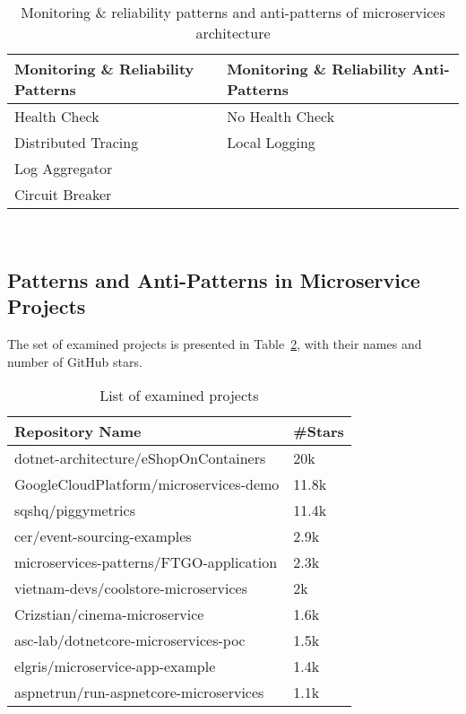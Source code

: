 \documentclass[11pt,a4paper,twocolumn]{article}
\begin{document}
\begin{table}[H]
\centering 
    \begin{tabular}{ 
  | >{\centering\arraybackslash} m{9em} 
  | >{\centering\arraybackslash} m{9em} | }
    \hline
    \rowcolor{bluepoli!40}
    \textbf{Monitoring \& Reliability Patterns} & \textbf{Monitoring \& Reliability Anti-Patterns}\T\B \\
    \hline \hline
    Health Check & No Health Check\T\B\\
    \hline
    \rowcolor{bluepoli!10}
    Distributed Tracing & Local Logging\T\B\\
    \hline
    Log Aggregator & \T\B\\
    \hline
    \rowcolor{bluepoli!10}
    Circuit Breaker & \T\B\\
    \hline
    \end{tabular}
    \\[10pt]
    \caption{Monitoring \& reliability patterns and anti-patterns of microservices architecture}
    \label{table:pattern_table_3}
\end{table}

\subsection{Patterns and Anti-Patterns in Microservice Projects}
\label{subsec:rq2}

The set of examined projects is presented in Table~\ref{table:project_list}, with their names and number of GitHub stars.
\begin{table}[H]
\centering 
    \begin{tabular}{ 
  | >{\centering\arraybackslash} m{15.3em} 
  | >{\centering\arraybackslash} m{3.5em} | }
    \hline
    \rowcolor{bluepoli!40}
    \textbf{Repository Name} & \textbf{\#Stars}\T\B \\
    \hline \hline
    dotnet-architecture/eShopOnContainers & 20k\T\B\\
    \hline
    \rowcolor{bluepoli!10}
    GoogleCloudPlatform/microservices-demo & 11.8k\T\B\\
    \hline
    sqshq/piggymetrics & 11.4k\T\B\\
    \hline
    \rowcolor{bluepoli!10}
    cer/event-sourcing-examples & 2.9k\T\B\\
    \hline
    microservices-patterns/FTGO-application & 2.3k\T\B\\
    \hline
    \rowcolor{bluepoli!10}
    vietnam-devs/coolstore-microservices & 2k\T\B\\
    \hline
    Crizstian/cinema-microservice & 1.6k\T\B\\
    \hline
    \rowcolor{bluepoli!10}
    asc-lab/dotnetcore-microservices-poc & 1.5k\T\B\\
    \hline
    elgris/microservice-app-example & 1.4k\T\B\\
    \hline
    \rowcolor{bluepoli!10}
    aspnetrun/run-aspnetcore-microservices & 1.1k\T\B\\
    \hline
    \end{tabular}
    \\[10pt]
    \caption{List of examined projects}
    \label{table:project_list}
\end{table}
\end{document}
